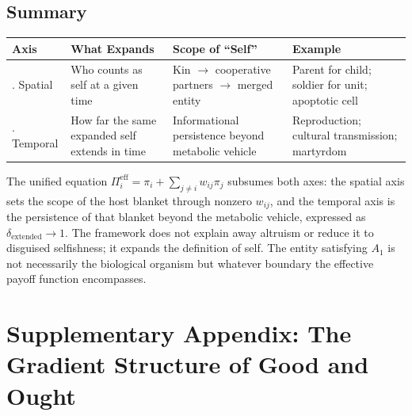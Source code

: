 \documentclass[11pt]{article}
\theoremstyle{plain}
\theoremstyle{definition}
\theoremstyle{remark}
\newcounter{none}
\let\origsection\section
\renewcommand{\section}{\needspace{12\baselineskip}\origsection}
\let\origsubsection\subsection
\renewcommand{\subsection}{\needspace{7\baselineskip}\origsubsection}
\begin{document}
\subsection{Summary}\label{summary}

{\def\LTcaptype{none} %
\begin{longtable}[]{@{}
  >{\raggedright\arraybackslash}p{}
  >{\raggedright\arraybackslash}p{}
  >{\raggedright\arraybackslash}p{}
  >{\raggedright\arraybackslash}p{}@{}}
\toprule\noalign{}
\begin{minipage}[b]{\linewidth}\raggedright
Axis
\end{minipage} & \begin{minipage}[b]{\linewidth}\raggedright
What Expands
\end{minipage} & \begin{minipage}[b]{\linewidth}\raggedright
Scope of ``Self''
\end{minipage} & \begin{minipage}[b]{\linewidth}\raggedright
Example
\end{minipage} \\
\midrule\noalign{}
\endhead
\bottomrule\noalign{}
\endlastfoot
1. Spatial & Who counts as self at a given time & Kin \(\to\)
cooperative partners \(\to\) merged entity & Parent for child; soldier
for unit; apoptotic cell \\
2. Temporal & How far the same expanded self extends in time &
Informational persistence beyond metabolic vehicle & Reproduction;
cultural transmission; martyrdom \\
\end{longtable}
}

The unified equation
\(\Pi_i^{\text{eff}} = \pi_i + \sum_{j \neq i} w_{ij} \pi_j\) subsumes
both axes: the spatial axis sets the scope of the host blanket through
nonzero \(w_{ij}\), and the temporal axis is the persistence of that
blanket beyond the metabolic vehicle, expressed as
\(\delta_{\text{extended}} \to 1\). The framework does not explain away
altruism or reduce it to disguised selfishness; it expands the
definition of self. The entity satisfying \(A_1\) is not necessarily the
biological organism but whatever boundary the effective payoff function
encompasses.

\newpage

\section{Supplementary Appendix: The Gradient Structure of Good and
Ought}\label{supplementary-appendix-the-gradient-structure-of-good-and-ought}
\end{document}
